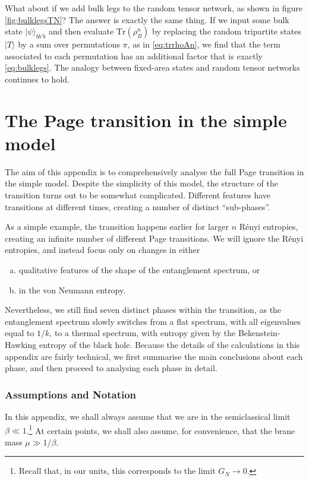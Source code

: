 \documentclass[12pt]{article}
\numberwithin{equation}{section}
\def\tr{\text{Tr}}
\begin{document}
What about if we add bulk legs to the random tensor network, as shown in figure \ref{fig:bulklegsTN}? The answer is exactly the same thing. If we input some bulk state $|\psi\rangle_{b b' \bar b}$ and then evaluate $\tr(\rho_B^n)$ by replacing the random tripartite states $| T \rangle$ by a sum over permutations $\pi$, as in \eqref{eq:trrhoAn}, we find that the term associated to each permutation has an additional factor that is exactly \eqref{eq:bulklegs}. The analogy between fixed-area states and random tensor networks continues to hold.

\section{The Page transition in the simple model}\label{app:pagephases}
The aim of this appendix is to comprehensively analyse the full Page transition in the simple model. Despite the simplicity of this model, the structure of the transition turns out to be somewhat complicated. Different features have transitions at different times, creating a number of distinct ``sub-phases''. 

As a simple example, the transition happens earlier for larger $n$ R\'{e}nyi entropies, creating an infinite number of different Page transitions. We will ignore the R\'{e}nyi entropies, and instead focus only on changes in either
\begin{enumerate}[(a)]
\item qualitative features of the shape of the entanglement spectrum, or 
\item in the von Neumann entropy. 
\end{enumerate}
Nevertheless, we still find seven distinct phases within the transition, as the entanglement spectrum slowly switches from a flat spectrum, with all eigenvalues equal to $1/k$, to a thermal spectrum, with entropy given by the Bekenstein-Hawking entropy of the black hole. Because the details of the calculations in this appendix are fairly technical, we first summarise the main conclusions about each phase, and then proceed to analysing each phase in detail. 

\subsubsection*{Assumptions and Notation}
In this appendix, we shall always assume that we are in the semiclassical limit $\beta \ll 1$.\footnote{Recall that, in our units, this corresponds to the limit $G_N \to 0$.} At certain points, we shall also assume, for convenience, that the brane mass $\mu \gg 1/\beta$.
\end{document}
